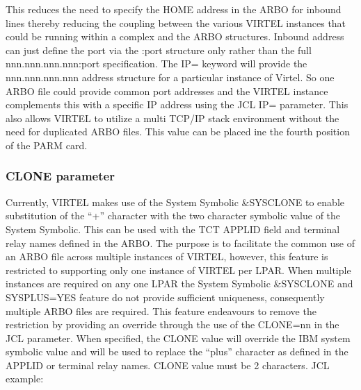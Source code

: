 \documentclass[letterpaper,10pt,english]{sphinxmanual}
\begin{document}
\begin{sphinxVerbatim}[commandchars=\\\{\}]
  
\end{sphinxVerbatim}

\sphinxAtStartPar
This reduces the need to specify the HOME address in the ARBO for inbound lines thereby reducing the coupling between the various VIRTEL instances that could be running within a complex and the ARBO structures. Inbound address can just define the port via the :port structure only rather than the full nnn.nnn.nnn.nnn:port specification. The IP= keyword will provide the nnn.nnn.nnn.nnn address structure for a particular instance of Virtel. So one ARBO file could provide common port addresses and the VIRTEL instance complements this with a specific IP address using the JCL IP= parameter. This also allows VIRTEL to utilize a multi TCP/IP stack environment without the need for duplicated ARBO files. This value can be placed ine the fourth position of the PARM card.

\ignorespaces 

\subsubsection{CLONE parameter}
\label{\detokenize{Installation_Guide:clone-parameter}}\label{\detokenize{Installation_Guide:index-15}}
\sphinxAtStartPar
Currently, VIRTEL makes use of the System Symbolic \&SYSCLONE to enable substitution of the “+” character with the two character symbolic value of the System Symbolic. This can be used with the TCT APPLID field and terminal relay names defined in the ARBO. The purpose is to facilitate the common use of an ARBO file across multiple instances of VIRTEL, however, this feature is restricted to supporting only one instance of VIRTEL per LPAR. When multiple instances are required on any one LPAR the System Symbolic \&SYSCLONE and SYSPLUS=YES feature do not provide sufficient uniqueness, consequently multiple ARBO files are required. This feature endeavours to remove the restriction by providing an override through the use of the CLONE=nn in the JCL parameter. When specified, the CLONE value will override the IBM system symbolic value and will be used to replace the “plus” character as defined in the APPLID or terminal relay names. CLONE value must be 2 characters. JCL example:\sphinxhyphen{}
\end{document}
